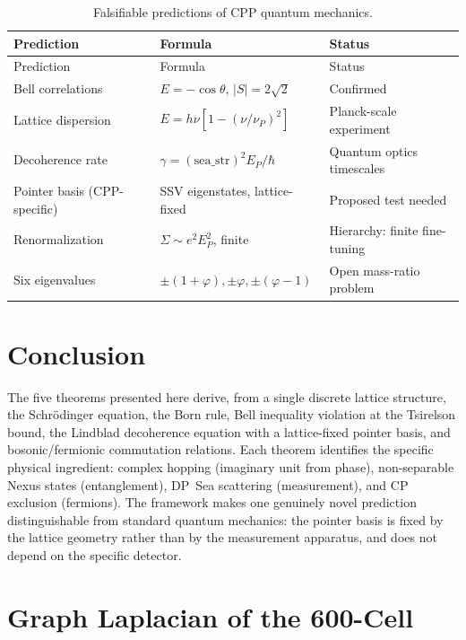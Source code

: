 \documentclass[11pt,a4paper]{article}
\newcommand{\EP}{E_P}
\begin{document}
\begin{longtable}{@{}p{4.5cm}p{4.5cm}p{3.5cm}@{}}
\caption{Falsifiable predictions of CPP quantum mechanics.}
\label{tab:predictions} \\
\toprule
Prediction & Formula & Status \\
\midrule
\endfirsthead
\toprule
Prediction & Formula & Status \\
\midrule
\endhead
\bottomrule
\endfoot
Bell correlations
& $E = -\cos\theta$, $|S| = 2\sqrt{2}$
& Confirmed \citep{hensen2015,giustina2015,shalm2015} \\[4pt]
Lattice dispersion
& $E = h\nu[1-({\nu}/{\nu_P})^2]$
& Planck-scale experiment \\[4pt]
Decoherence rate
& $\gamma = (\text{sea\_str})^2\EP/\hbar$
& Quantum optics timescales \\[4pt]
Pointer basis (CPP-specific)
& SSV eigenstates, lattice-fixed
& Proposed test needed \\[4pt]
Renormalization
& $\Sigma \sim e^2\EP^2$, finite
& Hierarchy: finite fine-tuning \\[4pt]
Six eigenvalues
& $\pm(1{+}\varphi),\pm\varphi,\pm(\varphi{-}1)$
& Open mass-ratio problem \\
\end{longtable}

\section{Conclusion}

The five theorems presented here derive, from a single discrete lattice
structure, the Schr\"{o}dinger equation, the Born rule, Bell inequality
violation at the Tsirelson bound, the Lindblad decoherence equation
with a lattice-fixed pointer basis, and bosonic/fermionic commutation
relations. Each theorem identifies the specific physical ingredient:
complex hopping (imaginary unit from phase), non-separable Nexus states
(entanglement), DP~Sea scattering (measurement), and CP exclusion
(fermions). The framework makes one genuinely novel prediction
distinguishable from standard quantum mechanics: the pointer basis is
fixed by the lattice geometry rather than by the measurement apparatus,
and does not depend on the specific detector.

\appendix
\section{Graph Laplacian of the 600-Cell}
\label{app:laplacian}
\end{document}
